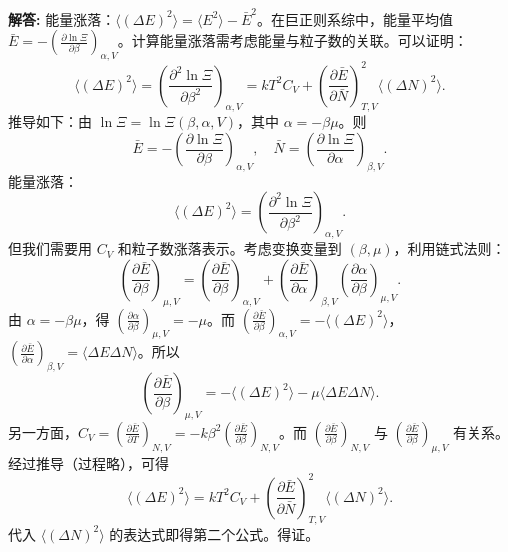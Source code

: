 \documentclass[12pt, a4paper, oneside]{ctexart}
\newenvironment{solution}{\par\noindent\textbf{解答:}\quad}{\par}
\begin{document}
\begin{solution}
    能量涨落：$\langle (\Delta E)^2 \rangle = \langle E^2 \rangle - \bar{E}^2$。在巨正则系综中，能量平均值 $\bar{E} = -\left( \frac{\partial \ln \Xi}{\partial \beta} \right)_{\alpha, V}$。计算能量涨落需考虑能量与粒子数的关联。可以证明：
    \[
    \langle (\Delta E)^2 \rangle = \left( \frac{\partial^2 \ln \Xi}{\partial \beta^2} \right)_{\alpha, V} = kT^2 C_V + \left( \frac{\partial \bar{E}}{\partial \bar{N}} \right)_{T,V}^2 \langle (\Delta N)^2 \rangle.
    \]
    推导如下：由 $\ln \Xi = \ln \Xi(\beta, \alpha, V)$，其中 $\alpha = -\beta \mu$。则
    \[
    \bar{E} = -\left( \frac{\partial \ln \Xi}{\partial \beta} \right)_{\alpha, V}, \quad \bar{N} = \left( \frac{\partial \ln \Xi}{\partial \alpha} \right)_{\beta, V}.
    \]
    能量涨落：
    \[
    \langle (\Delta E)^2 \rangle = \left( \frac{\partial^2 \ln \Xi}{\partial \beta^2} \right)_{\alpha, V}.
    \]
    但我们需要用 $C_V$ 和粒子数涨落表示。考虑变换变量到 $(\beta, \mu)$，利用链式法则：
    \[
    \left( \frac{\partial \bar{E}}{\partial \beta} \right)_{\mu, V} = \left( \frac{\partial \bar{E}}{\partial \beta} \right)_{\alpha, V} + \left( \frac{\partial \bar{E}}{\partial \alpha} \right)_{\beta, V} \left( \frac{\partial \alpha}{\partial \beta} \right)_{\mu, V}.
    \]
    由 $\alpha = -\beta \mu$，得 $\left( \frac{\partial \alpha}{\partial \beta} \right)_{\mu, V} = -\mu$。而 $\left( \frac{\partial \bar{E}}{\partial \beta} \right)_{\alpha, V} = -\langle (\Delta E)^2 \rangle$，$\left( \frac{\partial \bar{E}}{\partial \alpha} \right)_{\beta, V} = \langle \Delta E \Delta N \rangle$。所以
    \[
    \left( \frac{\partial \bar{E}}{\partial \beta} \right)_{\mu, V} = -\langle (\Delta E)^2 \rangle - \mu \langle \Delta E \Delta N \rangle.
    \]
    另一方面，$C_V = \left( \frac{\partial \bar{E}}{\partial T} \right)_{N, V} = -k \beta^2 \left( \frac{\partial \bar{E}}{\partial \beta} \right)_{N, V}$。而 $\left( \frac{\partial \bar{E}}{\partial \beta} \right)_{N, V}$ 与 $\left( \frac{\partial \bar{E}}{\partial \beta} \right)_{\mu, V}$ 有关系。经过推导（过程略），可得
    \[
    \langle (\Delta E)^2 \rangle = kT^2 C_V + \left( \frac{\partial \bar{E}}{\partial \bar{N}} \right)_{T,V}^2 \langle (\Delta N)^2 \rangle.
    \]
    代入 $\langle (\Delta N)^2 \rangle$ 的表达式即得第二个公式。得证。
\end{solution}
\end{document}
